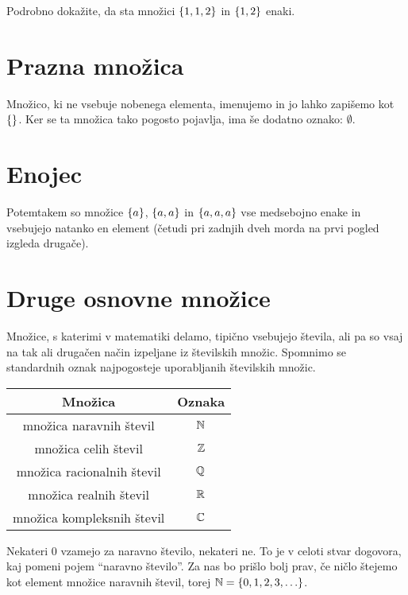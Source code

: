 \begin{vaja}
  Podrobno dokažite, da sta množici $\set{1, 1, 2}$ in $\set{1, 2}$ enaki.
\end{vaja}



\section{Prazna množica}
\label{sec:prazna-mnozica}


Množico, ki ne vsebuje nobenega elementa, imenujemo  in jo lahko zapišemo kot $\set{}$. Ker se ta množica tako pogosto pojavlja, ima še dodatno oznako: $\emptyset$.

\section{Enojec}
\label{sec:enojec}


Potemtakem so množice $\set{a}$, $\set{a, a}$ in $\set{a, a, a}$ vse medsebojno enake in vsebujejo natanko en element (četudi pri zadnjih dveh morda na prvi pogled izgleda drugače).

\section{Druge osnovne množice}


Množice, s katerimi v matematiki delamo, tipično vsebujejo števila, ali pa so vsaj na tak ali drugačen način izpeljane iz številskih množic. Spomnimo se standardnih oznak najpogosteje uporabljanih številskih množic.
\begin{center}
\begin{tabular}{|cc|}
\hline
\textbf{Množica} & \textbf{Oznaka} \\
\hline
množica naravnih števil & $\mathbb{N}$ \\
množica celih števil & $\mathbb{Z}$ \\
množica racionalnih števil & $\mathbb{Q}$ \\
množica realnih števil & $\mathbb{R}$ \\
množica kompleksnih števil & $\mathbb{C}$ \\
\hline
\end{tabular}
\end{center}

Nekateri $0$ vzamejo za naravno število, nekateri ne. To je v celoti stvar dogovora, kaj pomeni pojem ``naravno število''. Za nas bo prišlo bolj prav, če ničlo štejemo kot element množice naravnih števil, torej $\NN = \set{0, 1, 2, 3, \ldots}$.



